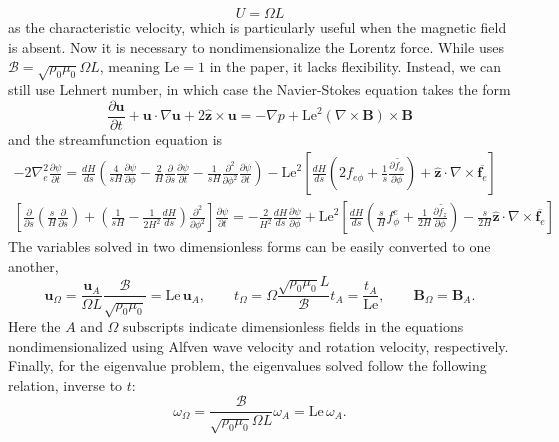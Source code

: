 \[U = \Omega L\]
as the characteristic velocity, which is particularly useful when the magnetic field is absent. Now it is necessary to nondimensionalize the Lorentz force. While \textcite{jackson_plesio-geostrophy_2020} uses $\mathscr{B} = \sqrt{\rho_0 \mu_0} \Omega L$, meaning $\mathrm{Le} = 1$ in the paper, it lacks flexibility. Instead, we can still use Lehnert number, in which case the Navier-Stokes equation takes the form
\[
    \frac{\partial \mathbf{u}}{\partial t} + \mathbf{u}\cdot \nabla \mathbf{u} + 2\hat{\mathbf{z}}\times \mathbf{u} = -\nabla p + \mathrm{Le}^2(\nabla\times\mathbf{B})\times \mathbf{B}
\]
and the streamfunction equation is
\[\begin{gathered}
    -2\nabla_e^2 \frac{\partial \psi}{\partial t} = \frac{dH}{ds} \left(\frac{4}{sH}\frac{\partial \psi}{\partial \phi} - \frac{2}{H}\frac{\partial}{\partial s}\frac{\partial \psi}{\partial t} - \frac{1}{sH}\frac{\partial^2}{\partial \phi^2}\frac{\partial \psi}{\partial t}\right) - \mathrm{Le}^2 \left[\frac{dH}{ds}\left(2f_{e\phi} + \frac{1}{s}\frac{\partial \widetilde{f_\phi}}{\partial \phi}\right) + \hat{\mathbf{z}}\cdot \nabla\times \overline{\mathbf{f}_e}\right] \\ 
    \left[\frac{\partial}{\partial s}\left(\frac{s}{H}\frac{\partial}{\partial s}\right) + \left(\frac{1}{sH} - \frac{1}{2H^2} \frac{dH}{ds}\right)\frac{\partial^2}{\partial \phi^2}\right] \frac{\partial \psi}{\partial t} = - \frac{2}{H^2}\frac{dH}{ds} \frac{\partial \psi}{\partial \phi} + \mathrm{Le}^2 \left[\frac{dH}{ds} \left(\frac{s}{H} f_\phi^e + \frac{1}{2H}\frac{\partial \widetilde{f_z}}{\partial \phi}\right) - \frac{s}{2H}\hat{\mathbf{z}}\cdot \nabla\times \overline{\mathbf{f}_e}\right]
\end{gathered}
\]
The variables solved in two dimensionless forms can be easily converted to one another,
\[
    \mathbf{u}_\Omega = \frac{\mathbf{u}_A}{\Omega L} \frac{\mathscr{B}}{\sqrt{\rho_0 \mu_0}} = \mathrm{Le} \, \mathbf{u}_A, \qquad t_\Omega = \Omega \frac{\sqrt{\rho_0 \mu_0} L}{\mathscr{B}} t_A = \frac{t_A}{\mathrm{Le}},\qquad \mathbf{B}_\Omega = \mathbf{B}_A.
\]
Here the $A$ and $\Omega$ subscripts indicate dimensionless fields in the equations nondimensionalized using Alfven wave velocity and rotation velocity, respectively. Finally, for the eigenvalue problem, the eigenvalues solved follow the following relation, inverse to $t$:
\[
    \omega_\Omega = \frac{\mathscr{B}}{\sqrt{\rho_0 \mu_0} \Omega L} \omega_A = \mathrm{Le} \, \omega_A.
\]
